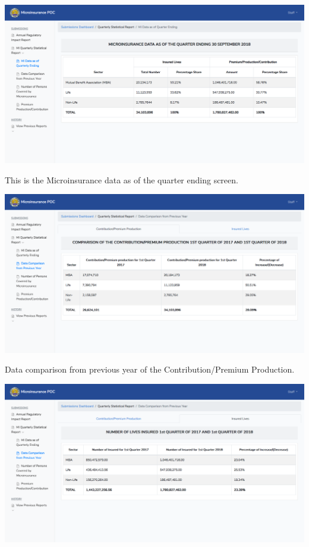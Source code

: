 \documentclass{article}
\begin{document}
\noindent{}\includegraphics[keepaspectratio=true]{up-ic-screens/image204}{}%

This is the Microinsurance data as of the quarter
ending screen.%

\includegraphics[keepaspectratio=true]{up-ic-screens/image49}{}%

Data comparison from previous year of the
Contribution/Premium Production.%

\includegraphics[keepaspectratio=true]{up-ic-screens/image67}{}%
\end{document}
